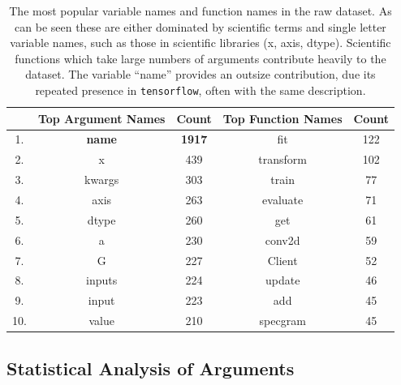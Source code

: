 \begin{table}[h!]
    \begin{center}
    \begin{tabular}{c | c | c | c | c}
        & Top Argument Names & Count  &   Top Function Names & Count \\  
        \hline               
        1.   &  \textbf{name}     &     \textbf{1917}    &   fit       &    122 \\        
        2.   &  x        &     439     &   transform &    102 \\         
        3.   &  kwargs   &     303     &   train     &    77 \\         
        4.   &  axis     &     263     &   evaluate  &    71 \\        
        5.   &  dtype    &     260     &   get       &    61 \\         
        6.   &  a        &     230     &   conv2d    &    59 \\        
        7.   &  G        &     227     &   Client    &    52 \\        
        8.   &  inputs   &     224     &   update    &    46 \\        
        9.   &  input    &     223     &   add       &    45 \\         
        10.  &  value    &     210     &   specgram  &    45 \\         
    
    \end{tabular}
    \caption {The most popular variable names and function names in the raw dataset. As can be seen these are either dominated by scientific terms  and single letter variable names, such as those in scientific libraries (x, axis, dtype). Scientific functions which take large numbers of arguments contribute heavily to the dataset. The variable ``name'' provides an outsize contribution, due its repeated presence in \texttt{tensorflow}, often with the same description. }
    \label{table:popular_variable_names}
    \end{center}
\end{table}

\subsection{Statistical Analysis of Arguments}


